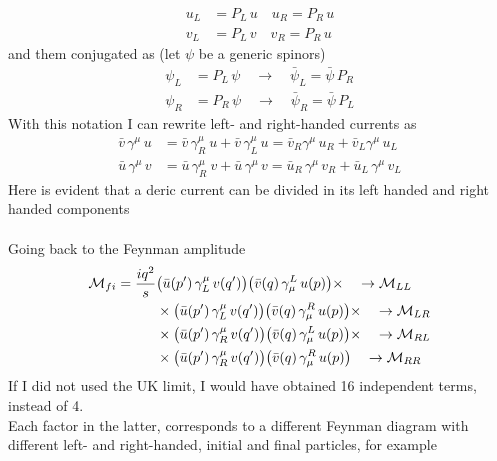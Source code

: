 \documentclass[TheoreticalPhy_ModB.tex]{subfiles}
\begin{document}
\begin{align*}
u_L 	& = P_L \, u 	\quad	u_R = P_R \, u \\
v_L 	& = P_L \, v	\quad	v_R = P_R \, u
\end{align*}
and them conjugated as (let $\psi$ be a generic spinors)
\begin{align*}
\psi_L 	& = P_L \, \psi \quad \to \quad \bar{\psi}_L = \bar{\psi} \, P_R \\
\psi_R 	& = P_R \, \psi \quad \to \quad \bar{\psi}_R = \bar{\psi} \, P_L
\end{align*}
With this notation I can rewrite left- and right-handed currents as
\begin{align*}
\bar{v} \, \gamma^{\mu} \, u 	& = \bar{v} \, \gamma^{\mu}_R \ u + \bar{v} \, \gamma_L^{\mu} \, u 	
	= \bar{v}_R \gamma^{\mu} \, u_R + \bar{v}_L \gamma^{\mu} \,  u_L \\
\bar{u} \, \gamma^{\mu} \, v 	& = \bar{u} \, \gamma^{\mu}_R \ v + \bar{u} \, \gamma^{\mu} \, v
	= \bar{u}_R \, \gamma^{\mu} \, v_R + \bar{u}_L \, \gamma^{\mu} \, v_L
\end{align*}
Here is evident that a deric current can be divided in its left handed and right handed components\\ \\
Going back to the Feynman amplitude
\begin{align*}
\mathcal{M}_{fi} = \frac{iq^2}{s}	
	& 		\bigl( \bar{u}(p') \, \gamma^{\mu}_L \, v(q') \bigr) \bigl( \bar{v}(q) \, \gamma_{\mu}^L \, u(p) \bigr) \times \quad \to \mathcal{M}_{LL}\\
	& \times 	\bigl( \bar{u}(p') \, \gamma^{\mu}_L \, v(q') \bigr) \bigl( \bar{v}(q) \, \gamma_{\mu}^R \, u(p) \bigl) \times \quad \to \mathcal{M}_{LR}\\
	& \times 	\bigl( \bar{u}(p') \, \gamma^{\mu}_R \, v(q') \bigr) \bigl( \bar{v}(q) \, \gamma_{\mu}^L \, u(p) \bigr) \times \quad \to \mathcal{M}_{RL}\\
	& \times 	\bigl( \bar{u}(p') \, \gamma^{\mu}_R \, v(q') \bigr) \bigl( \bar{v}(q) \, \gamma_{\mu}^R \, u(p) \bigr)  \quad \to \mathcal{M}_{RR}
\end{align*}
If I did not used the UK limit, I would have obtained 16 independent terms, instead of 4.\\
Each factor in the latter, corresponds to a different Feynman diagram with different left- and right-handed, initial and final particles, for example
\end{document}
